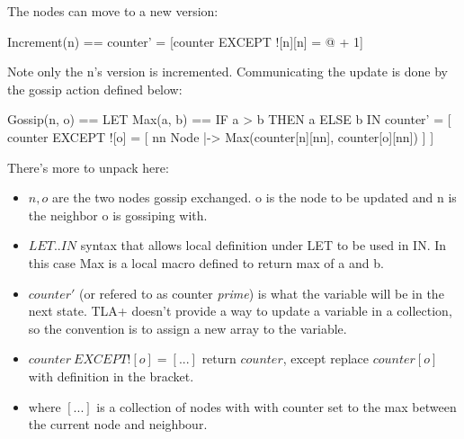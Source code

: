 \documentclass{report}
\begin{document}
The nodes can move to a new version: 
\begin{tla}
    Increment(n) == counter' = [counter EXCEPT ![n][n] = @ + 1]
\end{tla}
\begin{tlatex}
\end{tlatex}
 \newline\newline
Note only the n's version is incremented. Communicating the update is done by
the gossip action defined below:
\begin{tla}
Gossip(n, o) ==                  
    LET Max(a, b) == IF a > b THEN a ELSE b 
    IN counter' = [
        counter EXCEPT ![o] = [
            nn \in Node |->            
                Max(counter[n][nn], counter[o][nn])
            ] 
    ]
\end{tla}
\begin{tlatex}
%
\@x{\@s{16.4} \.{\IN} counter \.{'} \.{=} [}%
\@x{\@s{40.89} counter {\EXCEPT} {\bang} [ o ] \.{=} [}%
%
%
\@x{\@s{57.29} ]}%
\@x{\@s{16.4} ]}%
\end{tlatex}

There's more to unpack here: 
\begin{itemize}
    \item $n, o$ are the two nodes gossip exchanged. o is the node to be updated
    and n is the neighbor o is gossiping with.
    \item $LET .. IN$ syntax that allows local definition under LET to be used in
    IN. In this case Max is a local macro defined to return max of a and b.
    \item $counter'$ (or refered to as counter \textit{prime}) is what the
    variable will be in the next state. TLA+ doesn't provide a way to update a
    variable in a collection, so the convention is to assign a new array to the variable. 
    \item $counter\ EXCEPT ![o] = [...]$ return $counter$, except replace $counter[o]$
    with definition in the bracket.
    \item where $[...]$ is a collection of nodes with with counter set to the
    max between the current node and neighbour.
\end{itemize}
\end{document}
